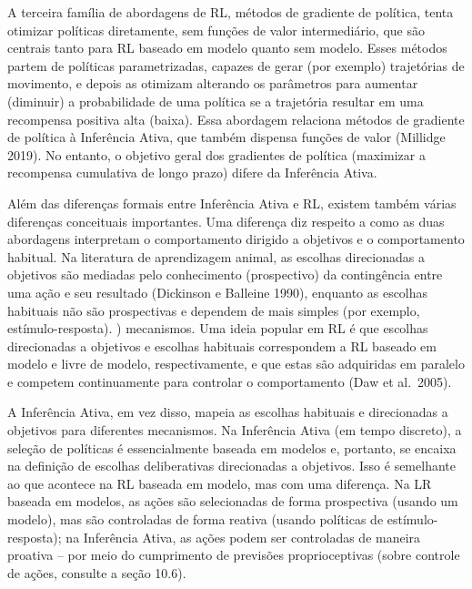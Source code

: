 \documentclass[
  12pt,
]{book}
\begin{document}
A terceira família de abordagens de RL, métodos de gradiente de política, tenta otimizar políticas diretamente, sem funções de valor intermediário, que são centrais tanto para RL baseado em modelo quanto sem modelo. Esses métodos partem de políticas parametrizadas, capazes de gerar (por exemplo) trajetórias de movimento, e depois as otimizam alterando os parâmetros para aumentar (diminuir) a probabilidade de uma política se a trajetória resultar em uma recompensa positiva alta (baixa). Essa abordagem relaciona métodos de gradiente de política à Inferência Ativa, que também dispensa funções de valor (Millidge 2019). No entanto, o objetivo geral dos gradientes de política (maximizar a recompensa cumulativa de longo prazo) difere da Inferência Ativa.

Além das diferenças formais entre Inferência Ativa e RL, existem também várias diferenças conceituais importantes. Uma diferença diz respeito a como as duas abordagens interpretam o comportamento dirigido a objetivos e o comportamento habitual. Na literatura de aprendizagem animal, as escolhas direcionadas a objetivos são mediadas pelo conhecimento (prospectivo) da contingência entre uma ação e seu resultado (Dickinson e Balleine 1990), enquanto as escolhas habituais não são prospectivas e dependem de mais simples (por exemplo, estímulo-resposta). ) mecanismos. Uma ideia popular em RL é que escolhas direcionadas a objetivos e escolhas habituais correspondem a RL baseado em modelo e livre de modelo, respectivamente, e que estas são adquiridas em paralelo e competem continuamente para controlar o comportamento (Daw et al.~2005).

A Inferência Ativa, em vez disso, mapeia as escolhas habituais e direcionadas a objetivos para diferentes mecanismos. Na Inferência Ativa (em tempo discreto), a seleção de políticas é essencialmente baseada em modelos e, portanto, se encaixa na definição de escolhas deliberativas direcionadas a objetivos. Isso é semelhante ao que acontece na RL baseada em modelo, mas com uma diferença. Na LR baseada em modelos, as ações são selecionadas de forma prospectiva (usando um modelo), mas são controladas de forma reativa (usando políticas de estímulo-resposta); na Inferência Ativa, as ações podem ser controladas de maneira proativa -- por meio do cumprimento de previsões proprioceptivas (sobre controle de ações, consulte a seção 10.6).
\end{document}
